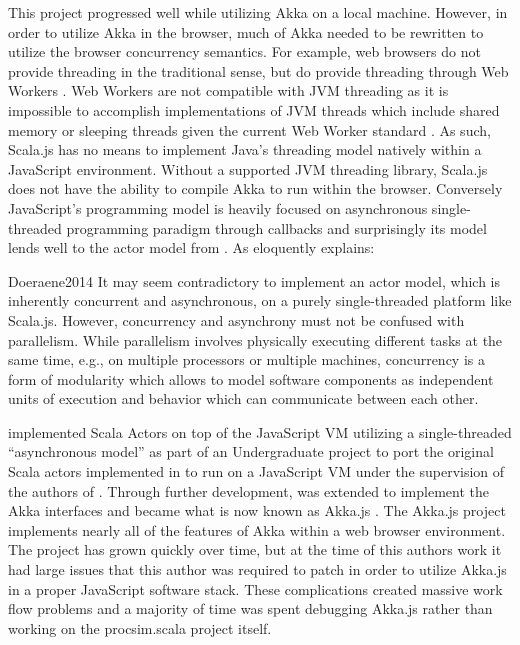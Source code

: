 This project progressed well while utilizing Akka on a local machine. However, in order to utilize Akka in the browser, much of Akka needed to be rewritten to utilize the browser concurrency semantics. For example, web browsers do not provide threading in the traditional sense, but do provide threading through Web Workers \cite{MDNWebWorkers}. Web Workers are not compatible with JVM threading as it is impossible to accomplish implementations of JVM threads which include shared memory or sleeping threads given the current Web Worker standard \cite{MDNWebWorkers, Doeraene2017}. As such, Scala.js has no means to implement Java's threading model natively within a JavaScript environment. Without a supported JVM threading library, Scala.js does not have the ability to compile Akka to run within the browser. Conversely JavaScript's programming model is heavily focused on asynchronous single-threaded programming paradigm through callbacks and surprisingly its model lends well to the actor model from \cite{Agha1985}. As \cite{Doeraene2014} eloquently explains:
\begin{displaycquote}{Doeraene2014}
    It may seem contradictory to implement an actor model, which is inherently concurrent and asynchronous,
    on a purely single-threaded platform like Scala.js. However, concurrency and asynchrony must not be confused with parallelism. While parallelism involves physically executing different tasks at the same time, e.g., on multiple processors or multiple machines, concurrency is a form of modularity which allows to model software components as independent units of execution and behavior which can communicate between each other.
\end{displaycquote}
\cite{Doeraene2014} implemented Scala Actors on top of the JavaScript VM utilizing a single-threaded ``asynchronous model'' as part of an Undergraduate project to port the original Scala actors implemented in \cite{Haller2009} to run on a JavaScript VM under the supervision of the authors of \cite{Haller2009}. Through further development, \cite{Doeraene2014} was extended to implement the Akka interfaces and became what is now known as Akka.js \cite{Stivan2015, akka-js2015}. The Akka.js project implements nearly all of the features of Akka within a web browser environment. The project has grown quickly over time, but at the time of this authors work it had large issues that this author was required to patch in order to utilize Akka.js in a proper JavaScript software stack. These complications created massive work flow problems and a majority of time was spent debugging Akka.js rather than working on the procsim.scala project itself.

